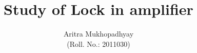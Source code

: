 \documentclass[10pt]{article}
\title{\textbf{Study of Lock in amplifier}}
\author{Aritra Mukhopadhyay\\(Roll. No.: 2011030)}
\date{}
\begin{document}
    \maketitle
    
    \begin{multicols*}{2}
        
        
        
        
        

        
        
        \nocite{*}
    \end{multicols*}
\end{document}
